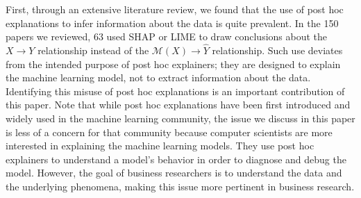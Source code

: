 \documentclass[mnsc,blindrev]{informs3}
\begin{document}
            First, through an extensive literature review, we found that the use of post hoc explanations to infer information about the data is quite prevalent. In the 150 papers we reviewed, 63 used SHAP or LIME to draw conclusions about the $X\rightarrow Y$ relationship instead of the $\mathcal{M}(X)\rightarrow \hat{Y}$ relationship. Such use deviates from the intended purpose of post hoc explainers; they are designed to explain the machine learning model, not to extract information about the data. Identifying this misuse of post hoc explanations is an important contribution of this paper. Note that while post hoc explanations have been first introduced and widely used in the machine learning community, the issue we discuss in this paper is less of a concern for that community because computer scientists are more interested in explaining the machine learning models. They use post hoc explainers to understand a model's behavior in order to diagnose and debug the model. However, the goal of business researchers is to understand the data and the underlying phenomena, making this issue more pertinent in business research.

\end{document}
